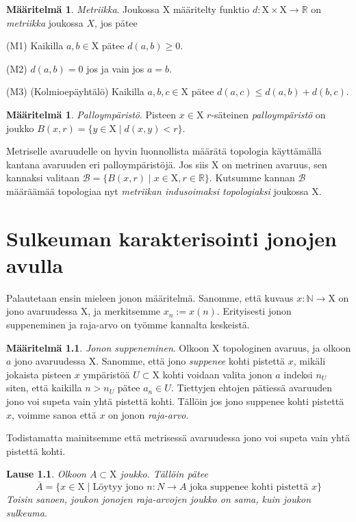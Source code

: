 \documentclass[12pt,a4paper,leqno]{report}
\newcommand{\R}{\mathbb{R}}
\newcommand{\N}{\mathbb{N}}
\newcommand{\X}{\mathrm{X}}
\newcommand{\B}{\mathcal{B}}
\theoremstyle{plain}
\newtheorem{lause}[equation]{Lause}
\theoremstyle{definition}
\newtheorem{maar}[equation]{Määritelmä}
\theoremstyle{remark}
\begin{document}
\begin{maar}\label{metmaar}
\emph{Metriikka}. Joukossa $\X$ määritelty funktio $d : \X \times \X \to \R$ on \emph{metriikka} joukossa $X$, jos pätee

(M1) Kaikilla $a, b \in \X$ pätee $d(a,b) \geq 0$.

(M2) $d(a,b) = 0$ jos ja vain jos $a = b$.

(M3) (Kolmioepäyhtälö) Kaikilla $a, b, c \in \X$ pätee $d(a,c) \leq d(a,b) + d(b,c)$.
\end{maar}

\begin{maar}\label{pallomar}
\emph{Palloympäristö}. Pisteen $x \in \X$ $r$-säteinen \emph{palloympäristö} on joukko $B(x,r) = \{ y \in \X \mid d(x, y) < r \}$.
\end{maar}

Metriselle avaruudelle on hyvin luonnollista määrätä topologia käyttämällä kantana avaruuden eri palloympäristöjä. Jos siis $\X$ on metrinen avaruus, sen kannaksi valitaan $\B = \{ B(x,r) \mid x \in \X, r \in \R \}$. Kutsumme kannan $\B$ määräämää topologiaa nyt \emph{metriikan indusoimaksi topologiaksi} joukossa $\X$.

\chapter{Sulkeuman karakterisointi jonojen avulla}

Palautetaan ensin mieleen jonon määritelmä. Sanomme, että kuvaus $x : \N \to \X$ on jono avaruudessa $\X$, ja merkitsemme $x_n := x(n)$. Erityisesti jonon suppeneminen ja raja-arvo on työmme kannalta keskeistä.

\begin{maar}\label{jonosupmaar}
\emph{Jonon suppeneminen}. Olkoon $\X$ topologinen avaruus, ja olkoon $a$ jono avaruudessa $\X$. Sanomme, että jono \emph{suppenee} kohti pistettä $x$, mikäli jokaista pisteen $x$ ympäristöä $U \subset \X$ kohti voidaan valita jonon $a$ indeksi $n_U$ siten, että kaikilla $n > n_U$ pätee $a_n \in U$. Tiettyjen ehtojen pätiessä avaruuden jono voi supeta vain yhtä pistettä kohti. Tällöin jos jono suppenee kohti pistettä $x$, voimme sanoa että $x$ on jonon \emph{raja-arvo}.
\end{maar}

Todistamatta mainitsemme että metrisessä avaruudessa jono voi supeta vain yhtä pistettä kohti.


\begin{lause}
Olkoon $A \subset \X$ joukko. Tällöin pätee
\begin{equation}
\overline{A} = \{x \in \X \mid \text{Löytyy jono } n : N \to A \text{ joka suppenee kohti pistettä } x\}
\end{equation}
Toisin sanoen, joukon jonojen raja-arvojen joukko on sama, kuin joukon sulkeuma.
\end{lause}
\end{document}
